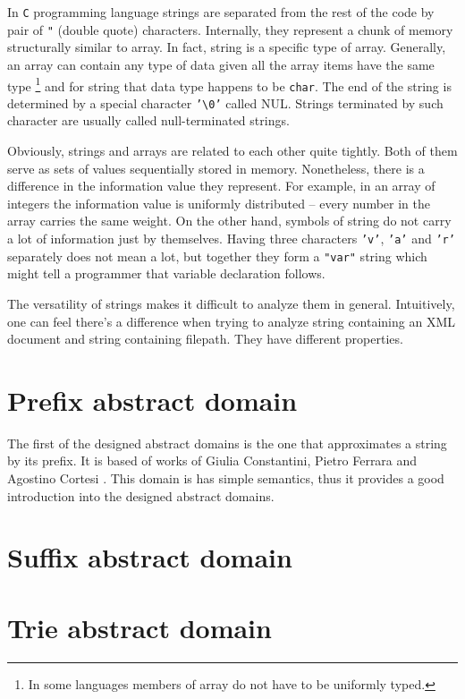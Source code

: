 \documentclass[12pt,final,oneside]{fithesis2}
\begin{document}
In \texttt{C} programming language strings are separated from the rest of
the code by pair of \texttt{"} (double quote) characters. Internally,
they represent a chunk of memory structurally similar to array. In fact,
string is a specific type of array. Generally, an array can contain any
type of data given all the array items have the same type \footnote{In some
languages members of array do not have to be uniformly typed.} and for
string that data type happens to be \texttt{char}. The end of the string is
determined by a special character \texttt{'\textbackslash0'} called NUL.
Strings terminated by such character are usually called null-terminated
strings.

Obviously, strings and arrays are related to each other quite tightly.
Both of them serve as sets of values sequentially stored in memory.
Nonetheless, there is a difference in the information value they represent.
For example, in an array of integers the information value is uniformly
distributed -- every number in the array carries the same weight. On the
other hand, symbols of string do not carry a lot of information just by
themselves. Having three characters \texttt{'v'}, \texttt{'a'} and
\texttt{'r'} separately does not mean a lot, but together they form
a \texttt{"var"} string which might tell a programmer that variable
declaration follows.

The versatility of strings makes it difficult to analyze them in general.
Intuitively, one can feel there's a difference when trying to analyze
string containing an XML document and string containing filepath. They
have different properties.


\section{Prefix abstract domain}

The first of the designed abstract domains is the one that approximates
a string by its prefix. It is based of works of Giulia Constantini,
Pietro Ferrara and Agostino Cortesi \cite{Constantini-1}. This domain
is has simple semantics, thus it provides a good introduction into the
designed abstract domains.


\section{Suffix abstract domain}


\section{Trie abstract domain}
\end{document}
